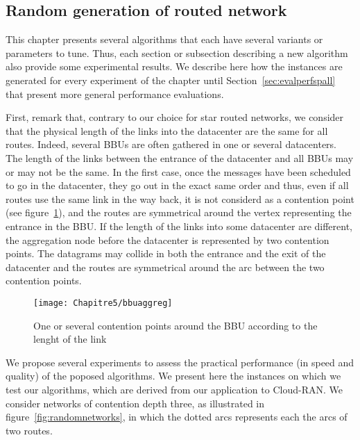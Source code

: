 \subsection{Random generation of routed network}
\label{sec:generationrouted}
This chapter presents several algorithms that each have several variants or parameters to tune. Thus, each section or subsection describing a new algorithm also provide some experimental results. We describe here how the instances are generated for every experiment of the chapter until Section~\ref{sec:evalperfspall} that present more general performance evaluations.

First, remark that, contrary to our choice for star routed networks, we consider that the physical length of the links into the datacenter are the same for all routes. Indeed, several BBUs are often gathered in one or several datacenters. The length of the links between the entrance of the datacenter and all BBUs may or may not be the same. In the first case, once the messages have been scheduled to go in the datacenter, they go out in the exact same order and thus, even if all routes use the same link in the way back, it is not considerd as a contention point (see figure~\ref{fig:bbuaggreg}), and the routes are symmetrical around the vertex representing the entrance in the BBU. If the length of the links into some datacenter are different, the aggregation node before the datacenter is represented by two contention points. The datagrams may collide in both the entrance and the exit of the datacenter and the routes are symmetrical around the arc between the two contention points.

    \begin{figure}

  \centering
  \texttt{[image: Chapitre5/bbuaggreg]}


\caption{One or several contention points around the BBU according to the lenght of the link}
\label{fig:bbuaggreg}
\end{figure}

We propose several experiments to assess the practical performance (in speed and quality) of the poposed algorithms. We present here the instances on which we test our algorithms, which are derived from our application to Cloud-RAN. We consider networks of contention depth three, as illustrated in figure~\ref{fig:randomnetworks}, in which the dotted arcs represents each the arcs of two routes. 



